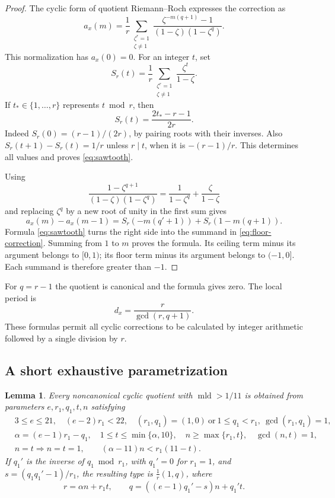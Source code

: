 \documentclass[12pt,a4paper]{article}
\numberwithin{equation}{section}
\newtheorem{lemma}[theorem]{Lemma}
\theoremstyle{definition}
\newcommand{\mld}{\operatorname{mld}}
\begin{document}
\begin{proof}
The cyclic form of quotient Riemann--Roch expresses the correction as
\[
 a_x(m)=\frac1r\sum_{\substack{\zeta^r=1\\\zeta\ne1}}
       \frac{\zeta^{-m(q+1)}-1}{(1-\zeta)(1-\zeta^q)}.
\]
This normalization has \(a_x(0)=0\). For an integer \(t\), set
\[
 S_r(t)=\frac1r\sum_{\substack{\zeta^r=1\\\zeta\ne1}}
                           \frac{\zeta^t}{1-\zeta}.
\]
If \(t_*\in\{1,\ldots,r\}\) represents \(t\bmod r\), then
\begin{equation}\label{eq:sawtooth}
                         S_r(t)=\frac{2t_*-r-1}{2r}.
\end{equation}
Indeed \(S_r(0)=(r-1)/(2r)\), by pairing roots with their inverses.
Also \(S_r(t+1)-S_r(t)=1/r\) unless \(r\mid t\), when it is
\(-(r-1)/r\). This determines all values and proves
\eqref{eq:sawtooth}.

Using
\[
 \frac{1-\zeta^{q+1}}{(1-\zeta)(1-\zeta^q)}
                    =\frac1{1-\zeta^q}+\frac{\zeta}{1-\zeta}
\]
and replacing \(\zeta^q\) by a new root of unity in the first sum gives
\[
 a_x(m)-a_x(m-1)
        =S_r(-m(q'+1))+S_r(1-m(q+1)).
\]
Formula \eqref{eq:sawtooth} turns the right side into the summand
in \eqref{eq:floor-correction}. Summing from \(1\) to \(m\) proves
the formula. Its ceiling term minus its argument belongs to
\([0,1)\); its floor term minus its argument belongs to \((-1,0]\).
Each summand is therefore greater than \(-1\).
\end{proof}

For \(q=r-1\) the quotient is canonical and the formula gives zero.
The local period is
\[
                           d_x=\frac r{\gcd(r,q+1)}.
\]
These formulas permit all cyclic corrections to be calculated by
integer arithmetic followed by a single division by \(r\).

\subsection{A short exhaustive parametrization}

\begin{lemma}\label{lem:cyclic-parameters}
Every noncanonical cyclic quotient with \(\mld>1/11\) is obtained
from parameters \(e,r_1,q_1,t,n\) satisfying
\begin{align}
 &3\leq e\leq21,\quad (e-2)r_1<22,\quad
   (r_1,q_1)=(1,0)\ \text{or}\ 1\leq q_1<r_1,\ \gcd(r_1,q_1)=1,
       \label{eq:param-a}\\
 &\alpha=(e-1)r_1-q_1,\quad
   1\leq t\leq\min\{\alpha,10\},\quad
   n\geq\max\{r_1,t\},\quad\gcd(n,t)=1,\label{eq:param-b}\\
 &n=t\Longrightarrow n=t=1,\qquad
            (\alpha-11)n<r_1(11-t).\label{eq:param-c}
\end{align}
If \(q_1'\) is the inverse of \(q_1\bmod r_1\), with
\(q_1'=0\) for \(r_1=1\), and \(s=(q_1q_1'-1)/r_1\), the resulting
type is \(\frac1r(1,q)\), where
\begin{equation}\label{eq:param-rq}
             r=\alpha n+r_1t,\qquad
             q=((e-1)q_1'-s)n+q_1't.
\end{equation}
\end{lemma}
\end{document}
